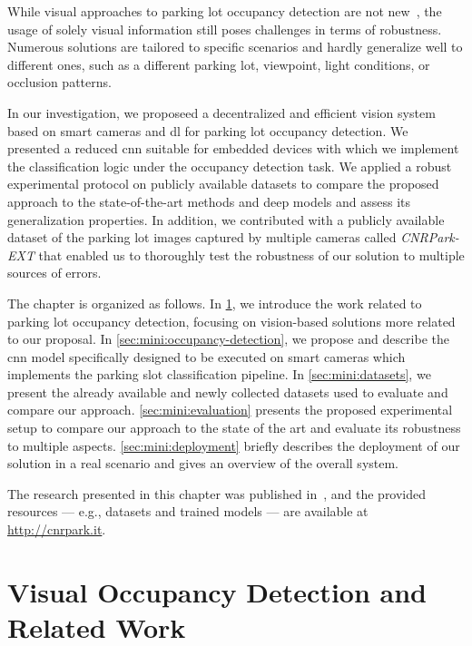 %
While visual approaches to parking lot occupancy detection are not new~\cite{dan2002parking,wu2007robust,del2015vacant,de2015pklot}, the usage of solely visual information still poses challenges in terms of robustness.
Numerous solutions are tailored to specific scenarios and hardly generalize well to different ones, such as a different parking lot, viewpoint, light conditions, or occlusion patterns.

In our investigation, we proposeed a decentralized and efficient vision system based on smart cameras and \gls{dl} for parking lot occupancy detection.
We presented a reduced \gls{cnn} suitable for embedded devices with which we implement the classification logic under the occupancy detection task.
We applied a robust experimental protocol on publicly available datasets to compare the proposed approach to the state-of-the-art methods and deep models and assess its generalization properties.
In addition, we contributed with a publicly available dataset of the parking lot images captured by multiple cameras called \emph{CNRPark-EXT} that enabled us to thoroughly test the robustness of our solution to multiple sources of errors.

The chapter is organized as follows.
In \ref{sec:mini:related-work}, we introduce the work related to parking lot occupancy detection, focusing on vision-based solutions more related to our proposal.
In \ref{sec:mini:occupancy-detection}, we propose and describe the \gls{cnn} model specifically designed to be executed on smart cameras which implements the parking slot classification pipeline.
In \ref{sec:mini:datasets}, we present the already available and newly collected datasets used to evaluate and compare our approach.
\ref{sec:mini:evaluation} presents the proposed experimental setup to compare our approach to the state of the art and evaluate its robustness to multiple aspects.
\ref{sec:mini:deployment} briefly describes the deployment of our solution in a real scenario and gives an overview of the overall system.

The research presented in this chapter was published in~\cite{amato2016car,amato2017deep}, and the provided resources --- e.g., datasets and trained models --- are available at \url{http://cnrpark.it}.

\section{Visual Occupancy Detection and Related Work}
\label{sec:mini:related-work}

